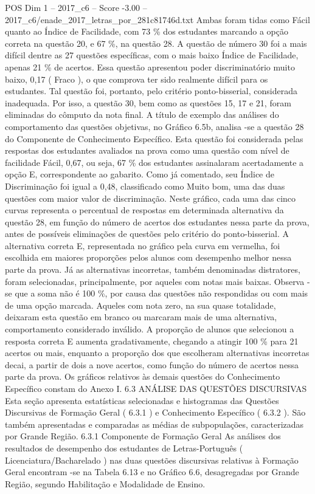 \begin{textsample}{POS Dim 1 – 2017\_c6 – Score -3.00 – 2017\_c6/enade\_2017\_letras\_por\_281c81746d.txt}
Ambas foram tidas como Fácil quanto ao Índice de Facilidade, com 73 \% dos estudantes marcando a opção correta na questão 20, e 67 \%, na questão 28.
A questão de número 30 foi a mais difícil dentre as 27 questões específicas, com o mais baixo Índice de Facilidade, apenas 21 \% de acertos.
Essa questão apresentou poder discriminatório muito baixo, 0,17 ( Fraco ), o que comprova ter sido realmente difícil para os estudantes.
Tal questão foi, portanto, pelo critério ponto-bisserial, considerada inadequada.
Por isso, a questão 30, bem como as questões 15, 17 e 21, foram eliminadas do cômputo da nota final.
A título de exemplo das análises do comportamento das questões objetivas, no Gráfico 6.5b, analisa -se a questão 28 do Componente de Conhecimento Específico.
Esta questão foi considerada pelas respostas dos estudantes avaliados na prova como uma questão com nível de facilidade Fácil, 0,67, ou seja, 67 \% dos estudantes assinalaram acertadamente a opção E, correspondente ao gabarito.
Como já comentado, seu Índice de Discriminação foi igual a 0,48, classificado como Muito bom, uma das duas questões com maior valor de discriminação.
Neste gráfico, cada uma das cinco curvas representa o percentual de respostas em determinada alternativa da questão 28, em função do número de acertos dos estudantes nessa parte da prova, antes de possíveis eliminações de questões pelo critério do ponto-bisserial.
A alternativa correta E, representada no gráfico pela curva em vermelha, foi escolhida em maiores proporções pelos alunos com desempenho melhor nessa parte da prova.
Já as alternativas incorretas, também denominadas distratores, foram selecionadas, principalmente, por aqueles com notas mais baixas.
Observa -se que a soma não é 100 \%, por causa das questões não respondidas ou com mais de uma opção marcada.
Aqueles com nota zero, na sua quase totalidade, deixaram esta questão em branco ou marcaram mais de uma alternativa, comportamento considerado inválido.
A proporção de alunos que selecionou a resposta correta E aumenta gradativamente, chegando a atingir 100 \% para 21 acertos ou mais, enquanto a proporção dos que escolheram alternativas incorretas decai, a partir de dois a nove acertos, como função do número de acertos nessa parte da prova.
Os gráficos relativos às demais questões do Conhecimento Específico constam do Anexo I. 6.3 ANÁLISE DAS QUESTÕES DISCURSIVAS Esta seção apresenta estatísticas selecionadas e histogramas das Questões Discursivas de Formação Geral ( 6.3.1 ) e Conhecimento Específico ( 6.3.2 ).
São também apresentadas e comparadas as médias de subpopulações, caracterizadas por Grande Região. 6.3.1 Componente de Formação Geral As análises dos resultados de desempenho dos estudantes de Letras-Português ( Licenciatura/Bacharelado ) nas duas questões discursivas relativas à Formação Geral encontram -se na Tabela 6.13 e no Gráfico 6.6, desagregadas por Grande Região, segundo Habilitação e Modalidade de Ensino.

\end{textsample}

